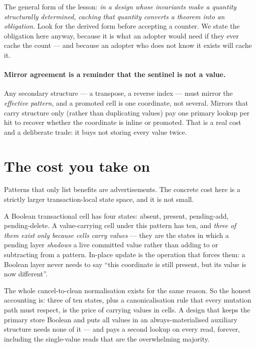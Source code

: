 \documentclass[11pt,a4paper]{article}
\theoremstyle{plain}
\theoremstyle{definition}
\theoremstyle{remark}
\begin{document}
The general form of the lesson: \emph{in a design whose invariants make a
quantity structurally determined, caching that quantity converts a theorem into
an obligation.} Look for the derived form before accepting a counter. We state
the obligation here anyway, because it is what an adopter would need if they
ever cache the count --- and because an adopter who does not know it
exists will cache it.

\paragraph{Mirror agreement is a reminder that the sentinel is not a value.}
Any secondary structure --- a transpose, a reverse index --- must mirror the
\emph{effective pattern}, and a promoted cell is one coordinate, not several.
Mirrors that carry structure only (rather than duplicating values) pay one
primary lookup per hit to recover whether the coordinate is inline or promoted.
That is a real cost and a deliberate trade: it buys not storing every value
twice.

\section{The cost you take on}
\label{sec:cost}

Patterns that only list benefits are advertisements. The concrete cost here is
a strictly larger transaction-local state space, and it is not small.

A Boolean transactional cell has four states: absent, present, pending-add,
pending-delete. A value-carrying cell under this pattern has ten, and
\emph{three of them exist only because cells carry values} --- they are the
states in which a pending layer \emph{shadows} a live committed value rather
than adding to or subtracting from a pattern. In-place update is the operation
that forces them: a Boolean layer never needs to say ``this coordinate is still
present, but its value is now different''.

The whole cancel-to-clean normalisation exists for the same reason. So the
honest accounting is: three of ten states, plus a canonicalisation rule that
every mutation path must respect, is the price of carrying values in cells. A
design that keeps the primary store Boolean and puts all values in an
always-materialised auxiliary structure needs none of it --- and pays a second
lookup on every read, forever, including the single-value reads that are the
overwhelming majority.
\end{document}
